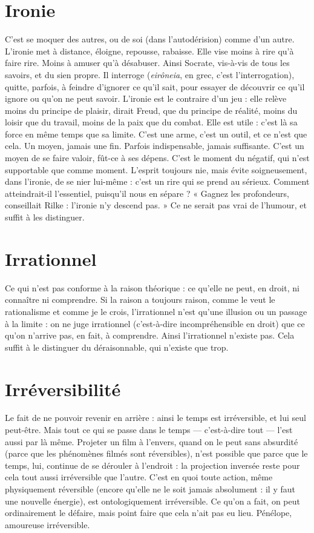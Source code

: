 {\section{Ironie}
C'est se moquer des autres, ou de soi (dans l’autodérision) comme
d’un autre. L’ironie met à distance, éloigne, repousse, rabaisse.
Elle vise moins à rire qu’à faire rire. Moins à amuser qu’à désabuser. Ainsi
Socrate, vis-à-vis de tous les savoirs, et du sien propre. Il interroge ({\it eirôneia}, en
grec, c’est l'interrogation), quitte, parfois, à feindre d’ignorer ce qu’il sait, pour
essayer de découvrir ce qu’il ignore ou qu’on ne peut savoir. L’ironie est le
contraire d’un jeu : elle relève moins du principe de plaisir, dirait Freud, que
du principe de réalité, moins du loisir que du travail, moins de la paix que du
combat. Elle est utile : c’est là sa force en même temps que sa limite. C’est une
arme, c’est un outil, et ce n’est que cela. Un moyen, jamais une fin. Parfois
indispensable, jamais suffisante. C’est un moyen de se faire valoir, fût-ce à ses
dépens. C’est le moment du négatif, qui n’est supportable que comme
moment. L'esprit toujours nie, mais évite soigneusement, dans l'ironie, de se
nier lui-même : c’est un rire qui se prend au sérieux. Comment atteindrait-il
l'essentiel, puisqu'il nous en sépare ? « Gagnez les profondeurs, conseillait Rilke :
l'ironie n’y descend pas. » Ce ne serait pas vrai de l’humour, et suffit à les distinguer.

\section{Irrationnel}
Ce qui n’est pas conforme à la raison théorique : ce qu’elle
ne peut, en droit, ni connaître ni comprendre. Si la raison
a toujours raison, comme le veut le rationalisme et comme je le crois, l’irrationnel
n’est qu’une illusion ou un passage à la limite : on ne juge irrationnel
(c’est-à-dire incompréhensible en droit) que ce qu’on n'arrive pas, en fait, à
comprendre. Ainsi l’irrationnel n’existe pas. Cela suffit à le distinguer du déraisonnable,
qui n’existe que trop.

\section{Irréversibilité}
Le fait de ne pouvoir revenir en arrière : ainsi le temps
est irréversible, et lui seul peut-être. Mais tout ce qui se
passe dans le temps — c’est-à-dire tout — l’est aussi par là même. Projeter un film
à l’envers, quand on le peut sans absurdité (parce que les phénomènes filmés
sont réversibles), n’est possible que parce que le temps, lui, continue de se
dérouler à l'endroit : la projection inversée reste pour cela tout aussi irréversible
que l’autre. C’est en quoi toute action, même physiquement réversible (encore
qu'elle ne le soit jamais absolument : il y faut une nouvelle énergie), est ontologiquement
irréversible. Ce qu’on a fait, on peut ordinairement le défaire,
mais point faire que cela n’ait pas eu lieu. Pénélope, amoureuse irréversible.

}
